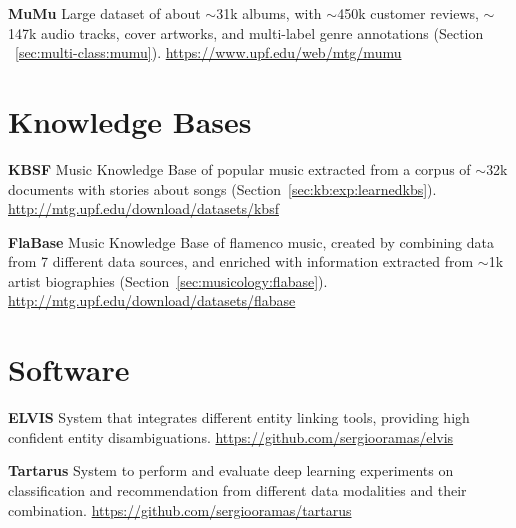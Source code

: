 \vspace{0.2cm}

\noindent \textbf{MuMu} Large dataset of about $\sim$31k albums, with $\sim$450k customer reviews, $\sim$147k audio tracks, cover artworks, and multi-label genre annotations (Section ~\ref{sec:multi-class:mumu}). \url{https://www.upf.edu/web/mtg/mumu}

\section{Knowledge Bases}

\noindent \textbf{KBSF} Music Knowledge Base of popular music extracted from a corpus of $\sim$32k documents with stories about songs (Section~\ref{sec:kb:exp:learnedkbs}). \url{http://mtg.upf.edu/download/datasets/kbsf}

\vspace{0.2cm}

\noindent \textbf{FlaBase} Music Knowledge Base of flamenco music, created by combining data from 7 different data sources, and enriched with information extracted from $\sim$1k artist biographies (Section~\ref{sec:musicology:flabase}). \url{http://mtg.upf.edu/download/datasets/flabase}


\section{Software}

\noindent \textbf{ELVIS} System that integrates different entity linking tools, providing high confident entity disambiguations. \url{https://github.com/sergiooramas/elvis}

\vspace{0.2cm}

\noindent \textbf{Tartarus} System to perform and evaluate deep learning experiments on classification and recommendation from different data modalities and their combination. \url{https://github.com/sergiooramas/tartarus}
 